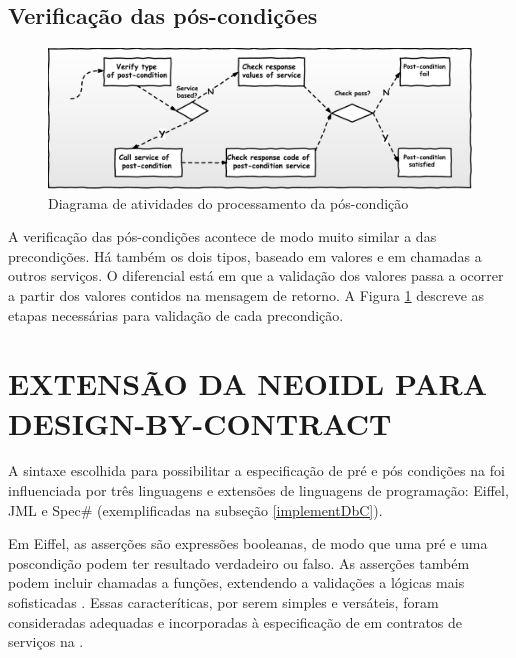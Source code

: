 \subsection{Verificação das pós-condições}
\vspace{-6mm}

\begin{figure}[!htb]
\centering
\includegraphics[width=140mm,trim = 0mm 0mm 0mm
0mm,clip]{img/FluxoPostcondicoes.pdf}
\vspace{-6mm}
\caption{Diagrama de atividades do processamento da pós-condição}
\label{FigServicePostcondition}
\end{figure}

A verificação das pós-condições acontece de modo muito similar a das
precondições. Há também os dois tipos, baseado em valores e em chamadas a
outros serviços. O diferencial está em que a validação dos valores passa a
ocorrer a partir dos valores contidos na mensagem de retorno. A Figura
\ref{FigServicePostcondition} descreve as etapas necessárias para validação de
cada precondição.


\section{EXTENSÃO DA NEOIDL PARA DESIGN-BY-CONTRACT}
\label{extensaoNeoIDL-DbC}

A sintaxe escolhida para possibilitar a especificação de pré e pós condições
na \neoidl{} foi influenciada por três linguagens e extensões de linguagens de
programação: Eiffel, JML e Spec\# (exemplificadas na subseção
\ref{implementDbC}). 

Em Eiffel, as asserções são expressões booleanas, de modo que uma pré e uma
poscondição podem ter resultado verdadeiro ou falso. As asserções também podem
incluir chamadas a funções, extendendo a validações a lógicas mais sofisticadas
\cite{meyer1992applying}. Essas caracteríticas, por serem simples e versáteis,
foram consideradas adequadas e incorporadas à especificação de
\designbycontract{} em contratos de serviços na \neoidl{}.

